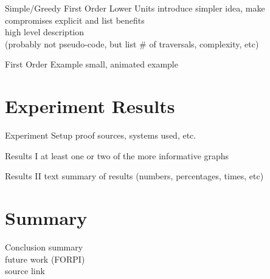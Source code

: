 \documentclass{beamer}
\begin{document}
\begin{frame}{Simple/Greedy First Order Lower Units}
introduce simpler idea, make compromises explicit and list benefits\\
high level description\\
(probably not pseudo-code, but list \# of traversals, complexity, etc)
\end{frame}

\begin{frame}{First Order Example}
small, animated example
\end{frame}

\section{Experiment Results}

\begin{frame}{Experiment Setup}
proof sources, systems used, etc.
\end{frame}

\begin{frame}{Results I}
at least one or two of the more informative graphs
\end{frame}

\begin{frame}{Results II}
text summary of results (numbers, percentages, times, etc)
\end{frame}

\section*{Summary}

\begin{frame}{Conclusion}
summary\\
future work (FORPI)\\
source link\\
\end{frame}
\end{document}
